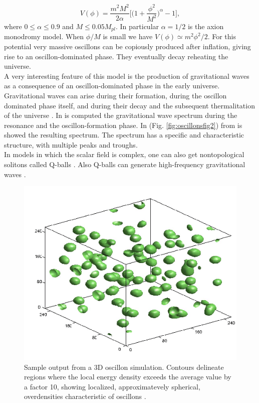 \documentclass[11pt,a4paper,twoside]{book}
\begin{document}
\begin{equation}
\label{Chap5:OscillonsPotential}
V(\phi)=\frac{m^{2}M^{2}}{2\alpha}\Bigg[\Bigg(1+\frac{\phi^{2}}{M^{2}}\Bigg)^{\alpha} - 1\Bigg],
\end{equation}
where $ 0 \le \alpha \le 0.9$ and $ M \le 0.05 M_{pl} $. In particular $\alpha = 1/2$ is the axion monodromy model. When $\phi/M$ is small we have $ V(\phi) \simeq m^{2}\phi^{2}/2 $. For this potential very massive oscillons can be copiously produced after inflation, giving rise to an oscillon-dominated phase. They eventually decay reheating the universe.\\
A very interesting feature of this model is the production of gravitational waves as a consequence of an oscillon-dominated phase in the early universe. Gravitational waves can arise during their formation, during the oscillon dominated phase  itself, and during their decay and the subsequent thermalitation of the universe \cite{Chap5:GWFromOscillon}. In \cite{Chap5:GWFromOscillon} is computed the gravitational wave spectrum during the resonance and the oscillon-formation phase. In (Fig. \ref{fig:oscillonsfig2}) from \cite{Chap5:GWFromOscillon} is showed the resulting spectrum. The spectrum has a specific and characteristic structure, with multiple peaks and troughs.\\
In models in which the scalar field is complex, one can also get nontopological solitons called Q-balls \cite{Chap5:QBall}. Also Q-balls can generate high-frequency gravitational waves \cite{Chap5:QBallGWS}.
\begin{figure}
	\centering
	\includegraphics[width=0.6\linewidth, height=0.35\textheight]{Images/Chap5/Oscillons_Fig1}
	\caption{Sample output from a 3D oscillon simulation. Contours delineate regions where the local energy density exceeds the average value by a factor 10, showing localized, approximatevely spherical, overdensities characteristic of oscillons \cite{Chap5:Oscillon_OscillonFormationInThreeDimension}.}
	\label{fig:oscillonsfig1}
\end{figure}
\end{document}

